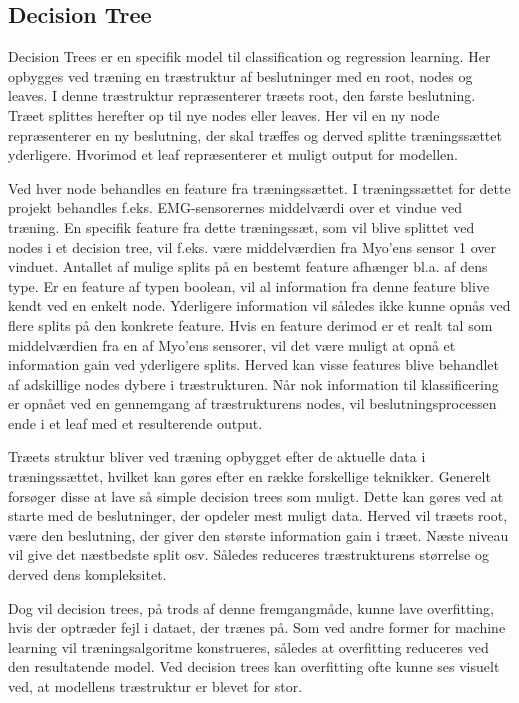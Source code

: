 \subsection{Decision Tree}
Decision Trees er en specifik model til classification og regression learning. Her opbygges ved træning en træstruktur af beslutninger med en root, nodes og leaves. I denne træstruktur repræsenterer træets root, den første beslutning. Træet splittes herefter op til nye nodes eller leaves. Her vil en ny node repræsenterer en ny beslutning, der skal træffes og derved splitte træningssættet yderligere. Hvorimod et leaf repræsenterer et muligt output for modellen. 


Ved hver node behandles en feature fra træningssættet. I træningssættet for dette projekt behandles f.eks. EMG-sensorernes middelværdi over et vindue ved træning. En specifik feature fra dette træningssæt, som vil blive splittet ved nodes i et decision tree, vil f.eks. være middelværdien fra Myo’ens sensor 1 over vinduet. 
Antallet af mulige splits på en bestemt feature afhænger bl.a. af dens type. Er en feature af typen boolean, vil al information fra denne feature blive kendt ved en enkelt node. Yderligere information vil således ikke kunne opnås ved flere splits på den konkrete feature. Hvis en feature derimod er et realt tal som middelværdien fra en af Myo’ens sensorer, vil det være muligt at opnå et information gain ved yderligere splits. Herved kan visse features blive behandlet af adskillige nodes dybere i træstrukturen.
Når nok information til klassificering er opnået ved en gennemgang af træstrukturens nodes, vil beslutningsprocessen ende i et leaf med et resulterende output. 

Træets struktur bliver ved træning opbygget efter de aktuelle data i træningssættet, hvilket kan gøres efter en række forskellige teknikker. Generelt forsøger disse at lave så simple decision trees som muligt. Dette kan gøres ved at starte med de beslutninger, der opdeler mest muligt data. Herved vil træets root, være den beslutning, der giver den største information gain i træet. Næste niveau vil give det næstbedste split osv. Således reduceres træstrukturens størrelse og derved dens kompleksitet. 

Dog vil decision trees, på trods af denne fremgangmåde, kunne lave overfitting, hvis der optræder fejl i dataet, der trænes på. Som ved andre former for machine learning vil træningsalgoritme konstrueres, således at overfitting reduceres ved den resultatende model. Ved decision trees kan overfitting ofte kunne ses visuelt ved, at modellens træstruktur er blevet for stor. 

